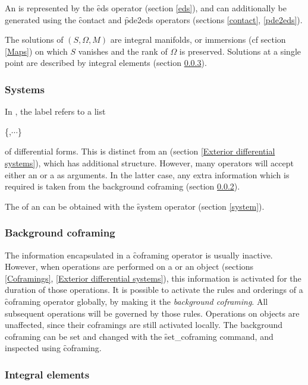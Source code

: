 An  is represented by the \f{eds} operator (section \ref{eds}),
and can additionally be generated using the \f{contact} and \f{pde2eds}
operators (sections \ref{contact}, \ref{pde2eds}).

The solutions of $(S,\Omega,M)$ are integral manifolds, or immersions (cf
section \ref{Maps}) on which $S$ vanishes and the rank of $\Omega$ is
preserved. Solutions at a single point are described by integral elements
(section \ref{Integral elements}).

\subsubsection{Systems}
\label{Systems}

In , the label  refers to a list
\begin{syntax}
	\{,$\cdots$\}
\end{syntax}
of differential forms. This is distinct from an  (section
\ref{Exterior differential systems}), which has additional structure.
However, many  operators will accept either an  or a
 as arguments. In the latter case, any extra information
which is required is taken from the background coframing (section
\ref{Background coframing}).

The  of an  can be obtained with the \f{system}
operator (section \ref{system}).

\subsubsection{Background coframing}
\label{Background coframing}

The information encapsulated in a \f{coframing} operator is usually
inactive. However, when operations are performed on a  or an
 object (sections \ref{Coframings}, \ref{Exterior differential
systems}), this information is activated for the duration of those
operations. It is possible to activate the rules and orderings of a
\f{coframing} operator globally, by making it the \emph{background
coframing}. All subsequent  operations will be governed by those
rules. Operations on  objects are unaffected, since their
coframings are still activated locally. The background coframing can be set
and changed with the \f{set\_coframing} command, and inspected using
\f{coframing}.

\subsubsection{Integral elements}
\label{Integral elements}

